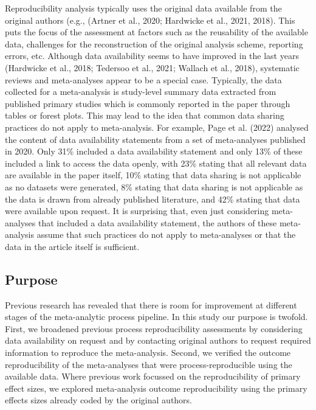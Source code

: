 \documentclass[
  ,jou, a4paper,floatsintext]{apa6}
\begin{document}
Reproducibility analysis typically uses the original data available from the original authors (e.g., (Artner et al., 2020; Hardwicke et al., 2021, 2018). This puts the focus of the assessment at factors such as the reusability of the available data, challenges for the reconstruction of the original analysis scheme, reporting errors, etc. Although data availability seems to have improved in the last years (Hardwicke et al., 2018; Tedersoo et al., 2021; Wallach et al., 2018), systematic reviews and meta-analyses appear to be a special case. Typically, the data collected for a meta-analysis is study-level summary data extracted from published primary studies which is commonly reported in the paper through tables or forest plots. This may lead to the idea that common data sharing practices do not apply to meta-analysis. For example, Page et al. (2022) analysed the content of data availability statements from a set of meta-analyses published in 2020. Only 31\% included a data availability statement and only 13\% of these included a link to access the data openly, with 23\% stating that all relevant data are available in the paper itself, 10\% stating that data sharing is not applicable as no datasets were generated, 8\% stating that data sharing is not applicable as the data is drawn from already published literature, and 42\% stating that data were available upon request. It is surprising that, even just considering meta-analyses that included a data availability statement, the authors of these meta-analysis assume that such practices do not apply to meta-analyses or that the data in the article itself is sufficient.

\hypertarget{purpose}{%
\subsection{Purpose}\label{purpose}}

Previous research has revealed that there is room for improvement at different stages of the meta-analytic process pipeline. In this study our purpose is twofold. First, we broadened previous process reproducibility assessments by considering data availability on request and by contacting original authors to request required information to reproduce the meta-analysis. Second, we verified the outcome reproducibility of the meta-analyses that were process-reproducible using the available data. Where previous work focussed on the reproducibility of primary effect sizes, we explored meta-analysis outcome reproducibility using the primary effects sizes already coded by the original authors.
\end{document}
